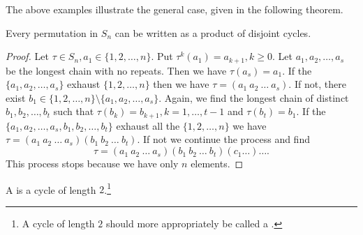 The above examples illustrate the general case, given in the
following theorem.
\begin{thm}
Every permutation in $S_n$ can be written as a product of disjoint
cycles.\label{thm:permu_is_prod_cycles}
\end{thm}
\begin{proof}
Let $\tau \in S_n, a_1\in\{1, 2, \ldots, n\}$. Put $\tau ^k (a_1)
= a_{k + 1}, k \geq 0$. Let $a_1, a_2, \ldots , a_s$ be the
longest chain with no repeats. Then we have $\tau (a_s) = a_1$. If
the  $\{a_1, a_2, \ldots , a_s\}$ exhaust $\{1, 2, \ldots, n\}$
then we have $\tau = (a_1\ a_2\ \ldots\ a_s)$. If not, there exist
$b_1\in \{1, 2, \ldots, n\} \setminus\{a_1, a_2, \ldots , a_s\}$.
Again, we find the longest chain of distinct $b_1, b_2, \ldots,
b_t$ such that $\tau (b_k) = b_{k + 1}, k = 1, \ldots, t -1$ and
$\tau (b_t) = b_1.$ If  the $\{a_1, a_2, \ldots , a_s, b_1, b_2,
\ldots, b_t\}$ exhaust all the $\{1, 2, \ldots, n\}$ we have $\tau
= (a_1\ a_2\ \ldots\ a_s)( b_1\ b_2\ \ldots\ b_t)$. If not we
continue the process and find $$\tau = (a_1\ a_2\ \ldots\ a_s)(
b_1\ b_2\ \ldots\ b_t)(c_1\ldots )\ldots . $$This process stops
because we have only $n$ elements.
\end{proof}
\begin{df}
A  is a cycle of length $2$.\footnote{A cycle
of length $2$ should more appropriately be called a .}
\end{df}


